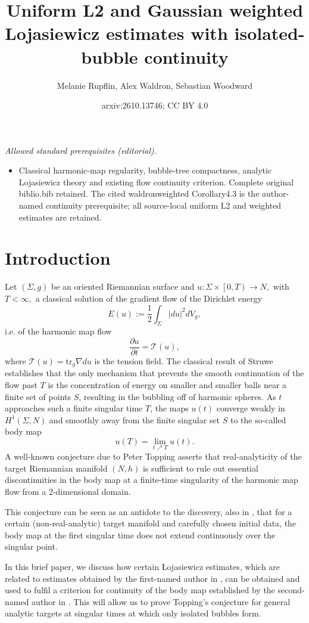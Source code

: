 \documentclass[10pt,reqno]{amsart}
\title{Uniform L2 and Gaussian weighted Lojasiewicz estimates with isolated-bubble continuity}
\author{Melanie Rupflin, Alex Waldron, Sebastian Woodward}
\date{arxiv:2610.13746; CC BY 4.0}
\theoremstyle{plain}
\theoremstyle{definition}
\numberwithin{equation}{section}
\newcommand{\Si}{\Sigma}
\newcommand{\T}{{\mathcal T}}
\newcommand{\half}{\frac{1}{2}}
\newcommand{\abs}[1]{\vert#1\vert}
\newcommand{\tr}{\text{tr}}
\newcommand{\Loj}{{\L}ojasiewicz }
\begin{document}
\maketitle
\noindent\textit{Allowed standard prerequisites (editorial).}\begin{itemize}
\item Classical harmonic-map regularity, bubble-tree compactness, analytic Lojasiewicz theory and existing flow continuity criterion. Complete original biblio.bib retained. The cited waldronweighted Corollary4.3 is the author-named continuity prerequisite; all source-local uniform L2 and weighted estimates are retained.
\end{itemize}\medskip
\section{Introduction}


Let $(\Sigma,g)$ be an oriented Riemannian surface and $u : \Sigma \times \left[ 0, T \right) \to N,$ with $T < \infty,$ a classical solution of the gradient flow of the Dirichlet energy $$E(u):=\half \int_\Si \abs{du}^2 dV_g,$$ i.e. of the harmonic map flow
$$\frac{\partial u}{\partial t} = \T(u),$$
where $\T(u) = \tr_g \nabla du$ is the tension field. 
The classical result \cite{struwehmsurfaces} of Struwe establishes that the only mechanism that prevents the smooth continuation of the flow past $T$ is the concentration of energy on smaller and smaller balls near a finite set of points $S$, resulting in the bubbling off of harmonic spheres.
As $t$ approaches such a finite singular time $T$, the maps $u(t)$ converge weakly in $H^1(\Sigma, N)$ and smoothly away from the finite singular set $S$ to the so-called body map
$$u(T) = \lim_{t \nearrow T} u(t).$$
A well-known conjecture due to Peter Topping \cite[p. 286]{toppingwindingbehavior} asserts that real-analyticity of the target Riemannian manifold $(N,h)$ is sufficient to rule out essential discontinuities in the body map at a finite-time singularity of the harmonic map flow from a 2-dimensional domain.

This conjecture can be seen as an antidote to the discovery, also in \cite{toppingwindingbehavior}, that for a certain (non-real-analytic) target manifold and carefully chosen initial data, the body map at the first singular time does not extend continuously over the singular point.

In this brief paper, we discuss how certain \Loj estimates, which are related to 
estimates obtained by the first-named author in \cite{rupflinharmonic}, can be obtained and used to fulfil a criterion for continuity of the body map established by the second-named author in \cite{waldronweighted}. This will allow us to prove Topping's conjecture for general analytic targets at singular times at which only isolated bubbles form. 
\end{document}
